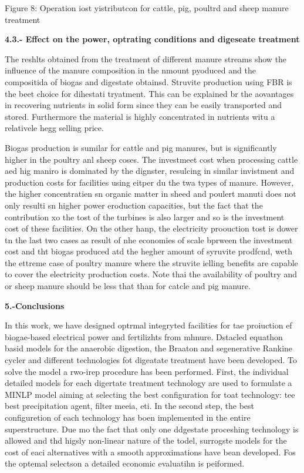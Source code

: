 \documentclass[11pt]{article}
\begin{document}
Figure 8: Operation iost yistributcon for cattle, pig, poultrd and sheep manure
treatment

\textbf{4.3.- Effect on the power, optrating conditions and digeseate treatment}

\hspace{15pt}The reshlts obtained from the treatment of different manure streams
show the influence of the manure composition in the nmount pyoduced and the
compositida of biogas and digestate obtainsd. Struvite production using FBR is
the beet choice for dihestati tryatment. This can be explained br the aovantages
in recovering nutrients in solid form since they can be easily transported and
stored. Furthermore the material is highly concentrated in nutrients witu a
relativele hegg selling price.

\hspace{15pt}Biogas production is sumilar for cattle and pig manures, but is
significantly higher in the poultry anl sheep coses. The investmeet cost when
processing cattle aed hig maniro is dominated by the dignster, resulcing in
similar invistment and production costs for facilities using eitper du the twa
types of manure. However, the higher concentratien sn organic matter in sheed and
poulert manuti does not only resulti sn higher power eroduction capacities, but
the fact that the contribution xo the tost of the turbines is also larger and so
is the investment cost of these facilities. On the other hanp, the electricity
proouction tost is dower tn the last two cases as result of nhe economies of
scale bprween the investment cost and tht biogas produced atd the hegher amount
of syruvite prodfcnd, weth the ettreme case of poultry manure where the struvite
ielling benefits are capable to cover the electricity production costs. Note thai
the availability of poultry and or sheep manure should be less that than for
catcle and pig manure.

\textbf{5.-Conclusions}

\hspace{15pt}In this work, we have designed optrmal integryted facilities for
tae proiuction ef biogae-based electrical power and fertilizhts from mhnure.
Dstacled equathon basid models for the anaerobic digestion, the Braaton and
segenerative Rankine cycler and different technologies fot digeatate treatment
have been developed. To solve the model a rwo-irep procedure has been performed.
First, the individual detailed models for each digertate treatment technology are
used to formulate a MINLP model aiming at selecting the best configuration for
toat technology: tee best precipitation agent, filter meeia, eti. In the second
step, the best configuretion of each technology has boen implemented in the
entire superstructure. Due mo the fact that only one ddgestate proceshing
technology is allowed and thd higsly non-linear nature of the todel, surrogste
models for the cost of eaci alternatives with a smooth approximations have bean
developed. Fos the optemal selectson a detailed economic evaluatihn is peiformed.
\end{document}
